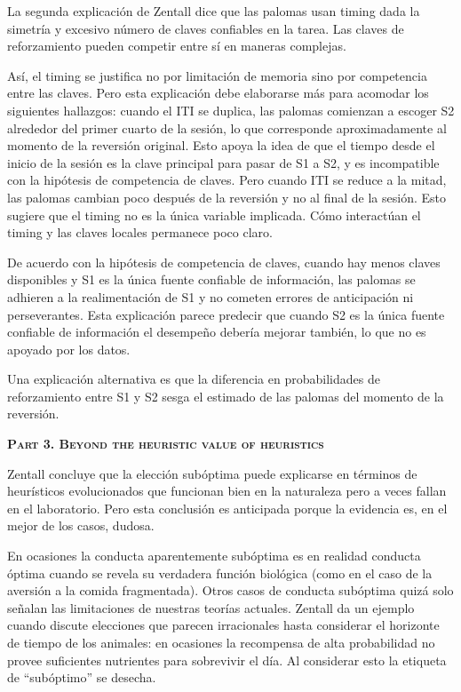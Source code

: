 \documentclass[a4paper,12pt]{article}
\begin{document}
La segunda explicación de Zentall dice que las palomas usan timing dada la simetría y excesivo número de claves confiables en la tarea. Las claves de reforzamiento pueden competir entre sí en maneras complejas.

Así, el timing se justifica no por limitación de memoria sino por competencia entre las claves. Pero esta explicación debe elaborarse más para acomodar los siguientes hallazgos: cuando el ITI se duplica, las palomas comienzan a escoger S2 alrededor del primer cuarto de la sesión, lo que corresponde aproximadamente al momento de la reversión original. Esto apoya la idea de que el tiempo desde el inicio de la sesión es la clave principal para pasar de S1 a S2, y es incompatible con la hipótesis de competencia de claves. Pero cuando ITI se reduce a la mitad, las palomas cambian poco después de la reversión y no al final de la sesión. Esto sugiere que el timing no es la única variable implicada. Cómo interactúan el timing y las claves locales permanece poco claro.

De acuerdo con la hipótesis de competencia de claves, cuando hay menos claves disponibles y S1 es la única fuente confiable de información, las palomas se adhieren a la realimentación de S1 y no cometen errores de anticipación ni perseverantes. Esta explicación parece predecir que cuando S2 es la única fuente confiable de información el desempeño debería mejorar también, lo que no es apoyado por los datos.

Una explicación alternativa es que la diferencia en probabilidades de reforzamiento entre S1 y S2 sesga el estimado de las palomas del momento de la reversión.

{\scshape\bfseries Part 3. Beyond the heuristic value of heuristics}

Zentall concluye que la elección subóptima puede explicarse en términos de heurísticos evolucionados que funcionan bien en la naturaleza pero a veces fallan en el laboratorio. Pero esta conclusión es anticipada porque la evidencia es, en el mejor de los casos, dudosa. 

En ocasiones la conducta aparentemente subóptima es en realidad conducta óptima cuando se revela su verdadera función biológica (como en el caso de la aversión a la comida fragmentada). Otros casos de conducta subóptima quizá solo señalan las limitaciones de nuestras teorías actuales. Zentall da un ejemplo cuando discute elecciones que parecen irracionales hasta considerar el horizonte de tiempo de los animales: en ocasiones la recompensa de alta probabilidad no provee suficientes nutrientes para sobrevivir el día. Al considerar esto la etiqueta de ``subóptimo'' se desecha.
\end{document}
